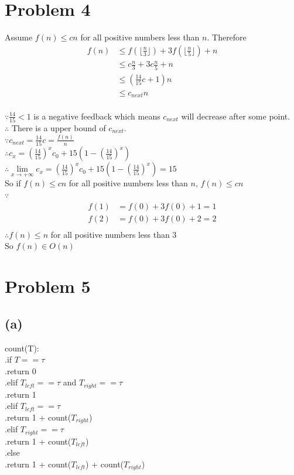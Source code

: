 \documentclass{article} %
\begin{document}
\section*{Problem 4}
Assume $f(n) \leqslant cn$ for all positive numbers less than $n$. Therefore\\
\[
\begin{array}{rlcr}
f(n)    &\leqslant f(\lfloor \frac{n}{3} \rfloor) + 3f(\lfloor \frac{n}{5} \rfloor) +n\\
        &\leqslant c \frac{n}{3} + 3c\frac{n}{5} + n\\
        &\leqslant (\frac{14}{15}c + 1)n\\
        &\leqslant c_{next}n
\end{array}
\]
\\
$\because \frac{14}{15}<1$ is a negative feedback which means $c_{next}$ will decrease after some point.\\
$\therefore$ There is a upper bound of $c_{next}$.\\
$\because c_{next} = \frac{14}{15}c =\frac{f(n)}{n}$\\
$\therefore c_{x} =(\frac{14}{15})^x c_0 + 15(1-(\frac{14}{15})^{x})$\\
$\therefore \lim\limits_{x\to+\infty}c_{x} =(\frac{14}{15})^x c_0 + 15(1-(\frac{14}{15})^{x}) = 15$\\
So if $f(n) \leqslant cn$ for all positive numbers less than $n$, $f(n)\leqslant cn$\\
$\because$
\[
\begin{array}{rlcr}
    f(1)    &=f(0)+3f(0)+1=1 \\
    f(2)    &=f(0)+3f(0)+2=2 \\
\end{array}
\]
$\therefore f(n)\leqslant n$ for all positive numbers less than 3\\
So $f(n) \in O(n)$\\

\section*{Problem 5}
\subsection*{(a)}
count(T):\\
.\qquad if $T == \tau$\\
.\qquad\qquad return 0\\
.\qquad elif $T_{left} == \tau$ and $T_{right} == \tau$\\
.\qquad\qquad return 1\\
.\qquad elif $T_{left} == \tau$\\
.\qquad\qquad return 1 + count($T_{right}$)\\
.\qquad elif $T_{right} == \tau$\\
.\qquad\qquad return 1 + count($T_{left}$)\\
.\qquad else\\
.\qquad\qquad return 1 + count($T_{left}$) + count($T_{right}$)\\
\\
\end{document}
